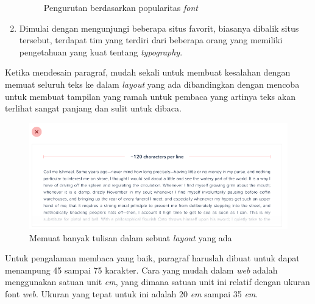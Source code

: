 \begin{enumerate}
\begin{figure}[H]
{			\caption{Pengurutan berdasarkan popularitas \textit{font} \citep{refactoringui}}}
		\label{gambar:refactoring-ui-g10.png}
	\end{figure}
	\item Dimulai dengan mengunjungi beberapa situs favorit, biasanya dibalik situs tersebut, terdapat tim yang terdiri dari beberapa orang yang memiliki pengetahuan yang kuat tentang \textit{typography}. 
\end{enumerate}

Ketika mendesain paragraf, mudah sekali untuk membuat kesalahan dengan memuat seluruh teks ke dalam \textit{layout} yang ada dibandingkan dengan mencoba untuk membuat tampilan yang ramah untuk pembaca yang artinya teks akan terlihat sangat panjang dan sulit untuk dibaca.
\begin{figure}[H]
	{\centering
		\includegraphics[keepaspectratio, width=16cm]{gambar/refactoring-ui-g11.png}
		\caption{Memuat banyak tulisan dalam sebuat \textit{layout} yang ada \citep{refactoringui}}}
	\label{gambar:refactoring-ui-g11.png}
\end{figure}

Untuk pengalaman membaca yang baik, paragraf haruslah dibuat untuk dapat menampung 45 sampai 75 karakter. Cara yang mudah dalam \textit{web} adalah menggunakan satuan unit \textit{em}, yang dimana satuan unit ini relatif dengan ukuran font \textit{web}. Ukuran yang tepat untuk ini adalah 20 \textit{em} sampai 35 \textit{em}.

